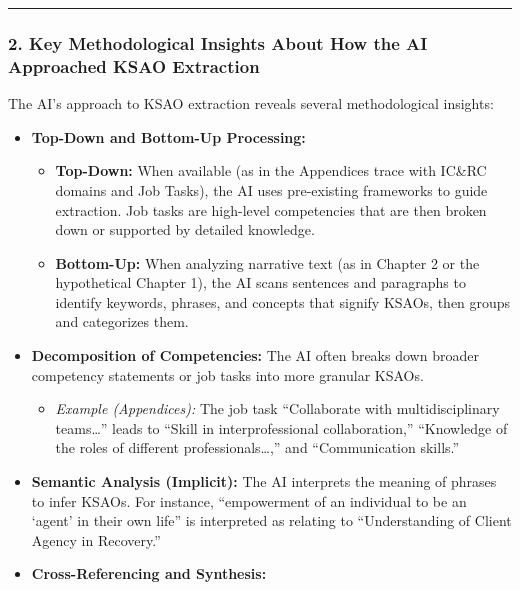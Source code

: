 \documentclass[
  letterpaper,
  DIV=11,
  numbers=noendperiod]{scrartcl}
\providecommand{\tightlist}{%
  \setlength{\itemsep}{0pt}\setlength{\parskip}{0pt}}
\begin{document}
\begin{center}\rule{0.5\linewidth}{0.5pt}\end{center}

\subsubsection{2. Key Methodological Insights About How the AI
Approached KSAO
Extraction}\label{key-methodological-insights-about-how-the-ai-approached-ksao-extraction}

The AI's approach to KSAO extraction reveals several methodological
insights:

\begin{itemize}
\item
  \textbf{Top-Down and Bottom-Up Processing:}

  \begin{itemize}
  \tightlist
  \item
    \textbf{Top-Down:} When available (as in the Appendices trace with
    IC\&RC domains and Job Tasks), the AI uses pre-existing frameworks
    to guide extraction. Job tasks are high-level competencies that are
    then broken down or supported by detailed knowledge.
  \item
    \textbf{Bottom-Up:} When analyzing narrative text (as in Chapter 2
    or the hypothetical Chapter 1), the AI scans sentences and
    paragraphs to identify keywords, phrases, and concepts that signify
    KSAOs, then groups and categorizes them.
  \end{itemize}
\item
  \textbf{Decomposition of Competencies:} The AI often breaks down
  broader competency statements or job tasks into more granular KSAOs.

  \begin{itemize}
  \tightlist
  \item
    \emph{Example (Appendices):} The job task ``Collaborate with
    multidisciplinary teams\ldots{}'' leads to ``Skill in
    interprofessional collaboration,'' ``Knowledge of the roles of
    different professionals\ldots,'' and ``Communication skills.''
  \end{itemize}
\item
  \textbf{Semantic Analysis (Implicit):} The AI interprets the meaning
  of phrases to infer KSAOs. For instance, ``empowerment of an
  individual to be an `agent' in their own life'' is interpreted as
  relating to ``Understanding of Client Agency in Recovery.''
\item
  \textbf{Cross-Referencing and Synthesis:}


\end{itemize}
\end{document}
